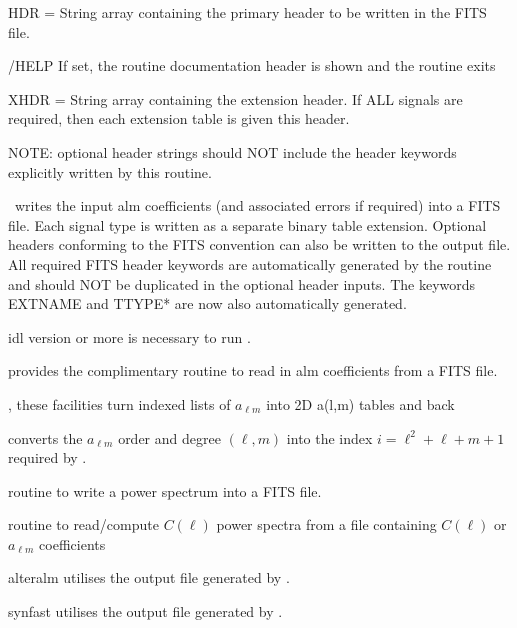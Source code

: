 \begin{keywords}
  \begin{kwlist}{} %
    \item[HDR =] String array containing the primary header to be written in the FITS
      file. 
    \item[/HELP] If set, the routine documentation header is shown and the routine exits	
    \item[XHDR =] String array containing the extension header. If
                  ALL signals are required, then each extension table
                  is given this header.
    \item[ ] NOTE: optional header strings should NOT include the
             header keywords explicitly written by this routine.
  \end{kwlist}
\end{keywords}  

\begin{codedescription}
{\thedocid\ writes the input alm coefficients (and associated errors if 
required) into a FITS file. Each signal type is written as a separate
binary table extension. Optional headers conforming
to the FITS convention can also be written to the output file. All
required FITS header keywords are automatically generated by the
routine and should NOT be duplicated in the optional header inputs.
The keywords EXTNAME and TTYPE* are now also automatically generated.
}
\end{codedescription}



\begin{related}
  \begin{sulist}{} %
    \item[idl] version \idlversion or more is necessary to run \thedocid.
    \item[\htmlref{fits2alm}{idl:fits2alm}] provides the complimentary routine to read in 
      alm coefficients from a FITS file.
    \item[\htmlref{alm\_i2t}{idl:alm_i2t}, \htmlref{alm\_t2i}{idl:alm_t2i}]
these facilities turn indexed lists of $a_{\ell m}$ into 2D a(l,m) tables and back
    \item[\htmlref{lm2index}{idl:lm2index}] converts the $a_{\ell m}$ order and degree
    $(\ell, m)$ into the index $i =\ell^2 + \ell + m + 1$ required by
\thedocid.
    \item[\htmlref{cl2fits}{idl:cl2fits}] routine to write a power spectrum into
a FITS file.
    \item[\htmlref{fits2cl}{idl:fits2cl}] routine to read/compute $C(\ell)$ power spectra 
   from a file containing $C(\ell)$ or $a_{\ell m}$ coefficients
    \item[alteralm] utilises the output file generated by \thedocid.
    \item[synfast] utilises the output file generated by \thedocid.
  \end{sulist}
\end{related}

